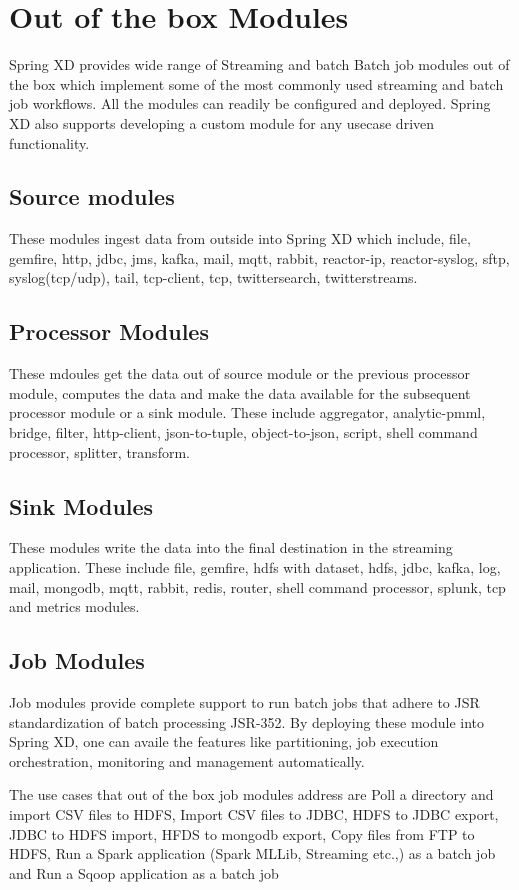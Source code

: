 \section{Out of the box Modules}
 Spring XD provides wide range of Streaming and batch Batch job modules out of the box which implement 
some of the most commonly used streaming and batch job workflows. All the modules can readily be configured and deployed.
Spring XD also supports developing a custom module for any usecase driven functionality.

\subsection{Source modules}

  These modules ingest data from outside into Spring XD which include, file, gemfire,
http, jdbc, jms, kafka, mail, mqtt, rabbit, reactor-ip, reactor-syslog, sftp, syslog(tcp/udp),
tail, tcp-client, tcp, twittersearch, twitterstreams.

\subsection{Processor Modules}
  These mdoules get the data out of source module or the previous processor module, computes
the data and make the data available for the subsequent processor module or a sink module.
These include aggregator, analytic-pmml, bridge, filter, http-client, json-to-tuple,
object-to-json, script, shell command processor, splitter, transform.

\subsection{Sink Modules}
  These modules write the data into the final destination in the streaming application.
These include file, gemfire, hdfs with dataset, hdfs, jdbc, kafka, log, mail, mongodb,
mqtt, rabbit, redis, router, shell command processor, splunk, tcp and metrics modules.

\subsection{Job Modules}

Job modules provide complete support to run batch jobs that adhere to JSR standardization of
batch processing JSR-352. By deploying these module into Spring XD, one can availe the 
features like partitioning, job execution orchestration, monitoring and  management
automatically. 

\par

The use cases that out of the box job modules address are Poll a directory and import CSV files to HDFS, 
Import CSV files to JDBC, HDFS to JDBC export, JDBC to HDFS import, HFDS to mongodb export, Copy files from FTP to HDFS, 
Run a Spark application (Spark MLLib, Streaming etc.,) as a batch job and 
Run a Sqoop application as a batch job

